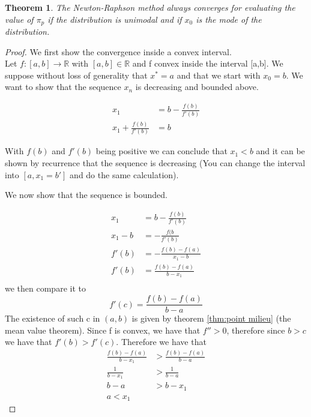 \documentclass[12pt,travaildirige,nobabel, twoside]{dms}
\numberwithin{equation}{section}
\numberwithin{table}{chapter}
\numberwithin{figure}{chapter}
\newtheorem{theorem}{Theorem}[section]
\begin{document}
\begin{theorem}
The Newton-Raphson method always converges for evaluating the value of $\pi_p$ if the distribution is unimodal and if $x_0$ is the mode of the distribution.
\end{theorem}
\begin{proof}
We first show the convergence inside a convex interval.\\
Let $f:[a,b]\to \mathbb{R}$ with $[a,b]\in\mathbb{R}$ and f convex inside the interval [a,b]. We suppose without loss of generality that $x^*=a$ and that we start with $x_0=b$. We want to show that the sequence $x_n$ is decreasing and bounded above. 

\begin{equation}
\begin{aligned}
x_1&=b-\frac{f(b)}{f'(b)}\\
x_1+\frac{f(b)}{f'(b)}&=b
\end{aligned}
\end{equation}

With $f(b)$ and $f'(b)$ being positive we can conclude that $x_1 < b$ and it can be shown by recurrence that the sequence is decreasing (You can change the interval into $[a,x_1=b']$ and do the same calculation).

We now show that the sequence is bounded. 

\begin{equation}
\begin{aligned}
x_1 &= b-\frac{f(b)}{f'(b)} \\
x_1-b&= -\frac{f(b}{f'(b)}  \\
f'(b) &= -\frac{f(b)-f(a)}{x_1-b}\\
f'(b) &= \frac{f(b)-f(a)}{b-x_1}\\
\end{aligned}
\end{equation}
we then compare it to 
\begin{equation}
f'(c)=\frac{f(b)-f(a)}{b-a}
\end{equation}
The existence of such c in $(a,b)$ is given by theorem \ref{thm:point milieu} (the mean value theorem).
Since f is convex, we have that $f''>0$, therefore since $b>c$ we have that $f'(b)>f'(c)$. Therefore we have that \begin{equation}
\begin{aligned}
 \frac{f(b)-f(a)}{b-x_1} &>\frac{f(b)-f(a)}{b-a}\\
 \frac{1}{b-x_1}&>\frac{1}{b-a}\\
 b-a &> b-x_1\\
 a<x_1
\end{aligned}
\end{equation}



\end{proof}
\end{document}
